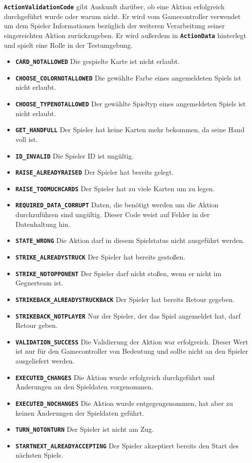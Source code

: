 \documentclass[
							a4paper, 
							11pt, 
							openany, 
							liststotoc,
							parskip=half, 
   							headings=normal
						]{scrreprt}
\begin{document}
{\textbf{\texttt{ActionValidationCode}} gibt Auskunft darüber, ob eine Aktion erfolgreich durchgeführt wurde oder warum nicht. Er wird vom Gamecontroller verwendet um dem Spieler Informationen bezüglich der weiteren Verarbeitung seiner eingereichten Aktion zurückzugeben. Er wird außerdem in \textbf{\texttt{ActionData}} hinterlegt und spielt eine Rolle in der Testumgebung.
\begin{itemize}
	\item \textbf{\texttt{CARD{\_}NOTALLOWED}} Die gespielte Karte ist nicht erlaubt.
	\item \textbf{\texttt{CHOOSE{\_}COLORNOTALLOWED}} Die gewählte Farbe eines angemeldeten Spiels ist nicht erlaubt.
	\item \textbf{\texttt{CHOOSE{\_}TYPENOTALLOWED}} Der gewählte Spieltyp eines angemeldeten Spiels ist nicht erlaubt.
	\item \textbf{\texttt{GET{\_}HANDFULL}} Der Spieler hat keine Karten mehr bekommen, da seine Hand voll ist.
	\item \textbf{\texttt{ID{\_}INVALID}} Die Spieler ID ist ungültig.
	\item \textbf{\texttt{RAISE{\_}ALREADYRAISED}} Der Spieler hat bereits gelegt.
	\item \textbf{\texttt{RAISE{\_}TOOMUCHCARDS}} Der Spieler hat zu viele Karten um zu legen.
	\item \textbf{\texttt{REQUIRED{\_}DATA{\_}CORRUPT}} Daten, die benötigt werden um die Aktion durchzuführen sind ungültig. Dieser Code weist auf Fehler in der Datenhaltung hin.
	\item \textbf{\texttt{STATE{\_}WRONG}} Die Aktion darf in diesem Spielstatus nicht ausgeführt werden.
	\item \textbf{\texttt{STRIKE{\_}ALREADYSTRUCK}} Der Spieler hat bereits gestoßen.
	\item \textbf{\texttt{STRIKE{\_}NOTOPPONENT}} Der Spieler darf nicht stoßen, wenn er nicht im Gegnerteam ist.
	\item \textbf{\texttt{STRIKEBACK{\_}ALREADYSTRUCKBACK}} Der Spieler hat bereits Retour gegeben.
	\item \textbf{\texttt{STRIKEBACK{\_}NOTPLAYER}} Nur der Spieler, der das Spiel angemeldet hat, darf Retour geben.
	\item \textbf{\texttt{VALIDATION{\_}SUCCESS}} Die Validierung der Aktion war erfolgreich. Dieser Wert ist nur für den Gamecontroller von Bedeutung und sollte nicht an den Spieler ausgeliefert werden.
	\item \textbf{\texttt{EXECUTED{\_}CHANGES}} Die Aktion wurde erfolgreich durchgeführt und Änderungen an den Spieldaten vorgenommen.
	\item \textbf{\texttt{EXECUTED{\_}NOCHANGES}} Die Aktion wurde entgegengenommen, hat aber zu keinen Änderungen der Spieldaten geführt.
	\item \textbf{\texttt{TURN{\_}NOTONTURN}} Der Spieler ist nicht am Zug.
	\item \textbf{\texttt{STARTNEXT{\_}ALREADYACCEPTING}} Der Spieler akzeptiert bereits den Start des nächs\-ten Spiels.
\end{itemize}\bigskip

}
\end{document}
